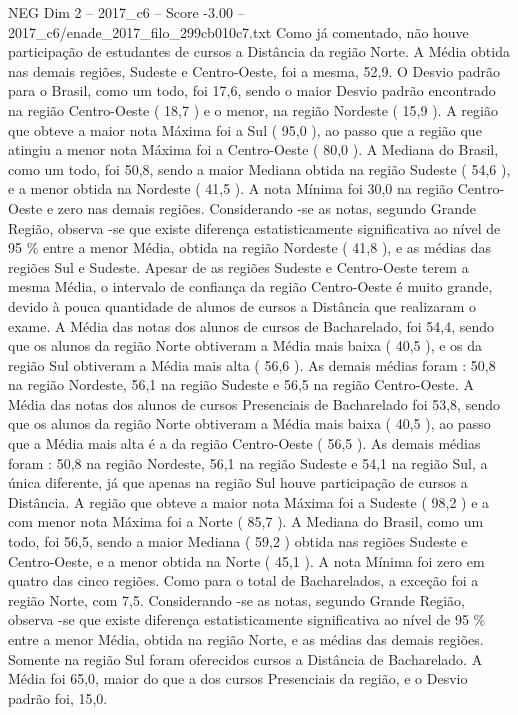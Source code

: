 \begin{textsample}{NEG Dim 2 – 2017\_c6 – Score -3.00 – 2017\_c6/enade\_2017\_filo\_299cb010c7.txt}
Como já comentado, não houve participação de estudantes de cursos a Distância da região Norte.
A Média obtida nas demais regiões, Sudeste e Centro-Oeste, foi a mesma, 52,9.
O Desvio padrão para o Brasil, como um todo, foi 17,6, sendo o maior Desvio padrão encontrado na região Centro-Oeste ( 18,7 ) e o menor, na região Nordeste ( 15,9 ).
A região que obteve a maior nota Máxima foi a Sul ( 95,0 ), ao passo que a região que atingiu a menor nota Máxima foi a Centro-Oeste ( 80,0 ).
A Mediana do Brasil, como um todo, foi 50,8, sendo a maior Mediana obtida na região Sudeste ( 54,6 ), e a menor obtida na Nordeste ( 41,5 ).
A nota Mínima foi 30,0 na região Centro-Oeste e zero nas demais regiões.
Considerando -se as notas, segundo Grande Região, observa -se que existe diferença estatisticamente significativa ao nível de 95 \% entre a menor Média, obtida na região Nordeste ( 41,8 ), e as médias das regiões Sul e Sudeste.
Apesar de as regiões Sudeste e Centro-Oeste terem a mesma Média, o intervalo de confiança da região Centro-Oeste é muito grande, devido à pouca quantidade de alunos de cursos a Distância que realizaram o exame.
A Média das notas dos alunos de cursos de Bacharelado, foi 54,4, sendo que os alunos da região Norte obtiveram a Média mais baixa ( 40,5 ), e os da região Sul obtiveram a Média mais alta ( 56,6 ).
As demais médias foram : 50,8 na região Nordeste, 56,1 na região Sudeste e 56,5 na região Centro-Oeste.
A Média das notas dos alunos de cursos Presenciais de Bacharelado foi 53,8, sendo que os alunos da região Norte obtiveram a Média mais baixa ( 40,5 ), ao passo que a Média mais alta é a da região Centro-Oeste ( 56,5 ).
As demais médias foram : 50,8 na região Nordeste, 56,1 na região Sudeste e 54,1 na região Sul, a única diferente, já que apenas na região Sul houve participação de cursos a Distância.
A região que obteve a maior nota Máxima foi a Sudeste ( 98,2 ) e a com menor nota Máxima foi a Norte ( 85,7 ).
A Mediana do Brasil, como um todo, foi 56,5, sendo a maior Mediana ( 59,2 ) obtida nas regiões Sudeste e Centro-Oeste, e a menor obtida na Norte ( 45,1 ).
A nota Mínima foi zero em quatro das cinco regiões.
Como para o total de Bacharelados, a exceção foi a região Norte, com 7,5.
Considerando -se as notas, segundo Grande Região, observa -se que existe diferença estatisticamente significativa ao nível de 95 \% entre a menor Média, obtida na região Norte, e as médias das demais regiões.
Somente na região Sul foram oferecidos cursos a Distância de Bacharelado.
A Média foi 65,0, maior do que a dos cursos Presenciais da região, e o Desvio padrão foi, 15,0.

\end{textsample}

